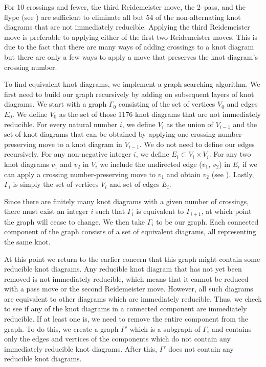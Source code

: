 \begin{paper}
For 10 crossings and fewer, the third Reidemeister move, the 2--pass, and the
flype (see \figMoves) are sufficient to eliminate all but 54 of the
non-alternating knot diagrams that are not immediately reducible.
Applying the third Reidemeister move is preferable to applying either of the
first two Reidemeister moves.
This is due to the fact that there are many ways of adding crossings to a knot
diagram but there are only a few ways to apply a move that preserves the knot
diagram's crossing number.



\noindent{}

To find equivalent knot diagrams, we implement a graph searching algorithm.
We first need to build our graph recursively by adding on subsequent layers of
knot diagrams.
We start with a graph $\Gamma_0$ consisting of the set of vertices $V_0$ and
edges $E_0$.
We define $V_0$ as the set of those 1176 knot diagrams that are not immediately
reducible.
For every natural number $i$, we define $V_i$ as the union of $V_{i-1}$ and the
set of knot diagrams that can be obtained by applying one crossing
number-preserving move to a knot diagram in $V_{i-1}$.
We do not need to define our edges recursively.
For any non-negative integer $i$, we define $E_i\subset V_i\times V_i$.
For any two knot diagrams $v_1$ and $v_2$ in $V_i$ we include the undirected
edge ($v_1$, $v_2$) in $E_i$ if we can apply a crossing number-preserving move
to $v_1$ and obtain $v_2$ (see \figMoves).
Lastly, $\Gamma_i$ is simply the set of vertices $V_i$ and set of edges $E_i$.

Since there are finitely many knot diagrams with a given number of crossings,
there must exist an integer $i$ such that $\Gamma_i$ is equivalent to
$\Gamma_{i+1}$, at which point the graph will cease to change.
We then take $\Gamma_i$ to be our graph.
Each connected component of the graph consists of a set of equivalent diagrams,
all representing the same knot.

At this point we return to the earlier concern that this graph might contain
some reducible knot diagrams.
Any reducible knot diagram that has not yet been removed is not immediately
reducible, which means that it cannot be reduced with a pass move or the second
Reidemeister move.
However, all such diagrams are equivalent to other diagrams which are
immediately reducible.
Thus, we check to see if any of the knot diagrams in a connected component are
immediately reducible.
If at least one is, we need to remove the entire component from the graph.
To do this, we create a graph $\Gamma'$ which is a subgraph of $\Gamma_i$ and
contains only the edges and vertices of the components which do not contain any
immediately reducible knot diagrams.
After this, $\Gamma'$ does not contain any reducible knot diagrams.


\end{paper}
